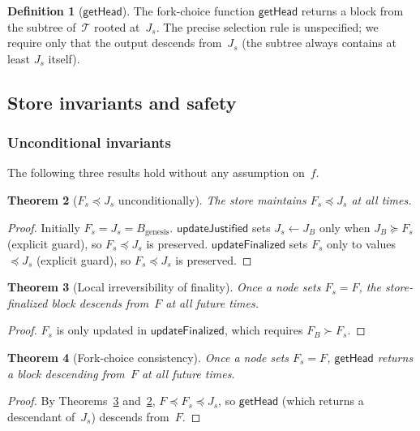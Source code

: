 \ifx\litemode\undefined\documentclass{article}\fi
\theoremstyle{plain}
\newtheorem{theorem}{Theorem}
\theoremstyle{definition}
\newtheorem{definition}[theorem]{Definition}
\theoremstyle{remark}
\begin{document}
\begin{definition}[$\textsf{getHead}$]\label{def:gethead}
The fork-choice function $\textsf{getHead}$ returns a block from the subtree of~$\mathcal{T}$ rooted at~$J_s$.
The precise selection rule is unspecified; we require only that the output descends from~$J_s$ (the subtree always contains at least $J_s$ itself).
\end{definition}

\subsection{Store invariants and safety}

\subsubsection*{Unconditional invariants}

The following three results hold without any assumption on~$f$.

\begin{theorem}[$F_s \preceq J_s$ unconditionally]\label{thm:fleqj}
The store maintains $F_s \preceq J_s$ at all times.
\end{theorem}

\begin{proof}
Initially $F_s = J_s = B_{\mathrm{genesis}}$.
$\textsf{updateJustified}$ sets $J_s \gets J_B$ only when $J_B \succeq F_s$ (explicit guard), so $F_s \preceq J_s$ is preserved.
$\textsf{updateFinalized}$ sets $F_s$ only to values $\preceq J_s$ (explicit guard), so $F_s \preceq J_s$ is preserved.
\end{proof}

\begin{theorem}[Local irreversibility of finality]\label{thm:finperm}
Once a node sets $F_s = F$, the store-finalized block descends from~$F$ at all future times.
\end{theorem}

\begin{proof}
$F_s$ is only updated in $\textsf{updateFinalized}$, which requires $F_B \succ F_s$.
\end{proof}

\begin{theorem}[Fork-choice consistency]\label{thm:fcconsistency}
Once a node sets $F_s = F$, $\textsf{getHead}$ returns a block descending from~$F$ at all future times.
\end{theorem}

\begin{proof}
By Theorems~\ref{thm:finperm} and~\ref{thm:fleqj}, $F \preceq F_s \preceq J_s$, so $\textsf{getHead}$ (which returns a descendant of~$J_s$) descends from~$F$.
\end{proof}
\end{document}
